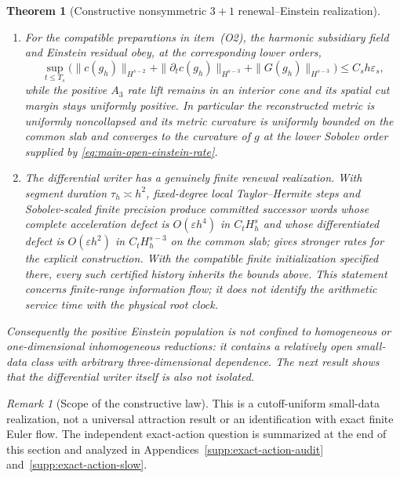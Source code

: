 \documentclass[11pt]{article}
\newtheorem{theorem}{Theorem}[section]
\numberwithin{equation}{section}
\theoremstyle{definition}
\theoremstyle{remark}
\newtheorem{remark}[remark]{Remark}
\begin{document}
\begin{theorem}[Constructive nonsymmetric $3+1$ renewal--Einstein realization]
\begin{enumerate}[label=\textup{(O\arabic*)},leftmargin=3em]
      Here $g_h$ denotes the canonical interpolation of $\eta+q_h$.
\item For the compatible preparations in item~\textup{(O2)}, the harmonic
      subsidiary field and Einstein residual obey, at the corresponding lower orders,
      \begin{equation}
       \sup_{t\le T_s}
       \bigl(\|c(g_h)\|_{H^{s-2}}+\|\partial_tc(g_h)\|_{H^{s-3}}
                  +\|G(g_h)\|_{H^{s-3}}\bigr)
       \le C_sh\varepsilon_s,
       \label{eq:main-open-subsidiary}
      \end{equation}
      while the positive $A_3$ rate lift remains in an interior cone and its
      spatial cut margin stays uniformly positive.  In particular the
      reconstructed metric is uniformly noncollapsed and its metric curvature
      is uniformly bounded on the common slab and converges to the curvature
      of $g$ at the lower Sobolev order supplied by
      \eqref{eq:main-open-einstein-rate}.
\item The differential writer has a genuinely finite renewal realization.
      With segment duration $\tau_h\asymp h^2$, fixed-degree local
      Taylor--Hermite steps and Sobolev-scaled finite precision produce
      committed successor words whose complete acceleration defect is
      $O(\varepsilon h^4)$ in $C_tH_h^s$ and whose differentiated defect is
      $O(\varepsilon h^2)$ in $C_tH_h^{s-3}$ on the common slab;
       gives stronger rates for the explicit construction.
      With the compatible finite initialization specified there, every such
      certified history inherits the bounds above.  This statement
      concerns finite-range information flow; it does not identify the
      arithmetic service time with the physical root clock.
\end{enumerate}
Consequently the positive Einstein population is not confined to homogeneous
or one-dimensional inhomogeneous reductions: it contains a relatively open
small-data class with arbitrary three-dimensional dependence.  The next
result shows that the differential writer itself is also not isolated.
\end{theorem}

\begin{remark}[Scope of the constructive law]
\label{rem:main-open-3plus1-scope}
This is a cutoff-uniform small-data realization, not a universal attraction
result or an identification with exact finite Euler flow. The independent
exact-action question is summarized at the end of this section and analyzed
in Appendices~\ref{supp:exact-action-audit} and~\ref{supp:exact-action-slow}.
\end{remark}
\end{document}
